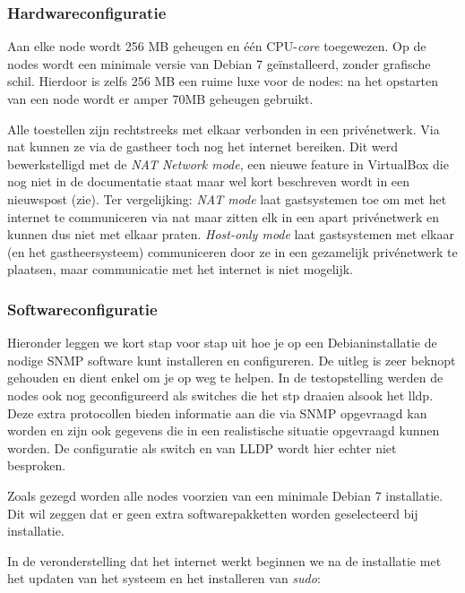 \subsubsection{Hardwareconfiguratie}

Aan elke node wordt 256 MB geheugen en één CPU-\textit{core} toegewezen.
Op de nodes wordt een minimale versie van Debian 7 geïnstalleerd, zonder grafische schil.
Hierdoor is zelfs 256 MB een ruime luxe voor de nodes: na het opstarten van een node wordt er amper 70MB geheugen gebruikt.

Alle toestellen zijn rechtstreeks met elkaar verbonden in een privénetwerk.
Via \gls{nat} kunnen ze via de gastheer toch nog het internet bereiken.
Dit werd bewerkstelligd met de \textit{NAT Network mode},
een nieuwe feature in VirtualBox die nog niet in de documentatie staat maar wel kort beschreven wordt in een nieuwspost (zie\cite{vbox-nat-network-mode}).
Ter vergelijking:
\textit{NAT mode} laat gastsystemen toe om met het internet te communiceren via \gls{nat} maar zitten elk in een apart privénetwerk en kunnen dus niet met elkaar praten.
\textit{Host-only mode} laat gastsystemen met elkaar (en het gastheersysteem) communiceren door ze in een gezamelijk privénetwerk te plaatsen, 
maar communicatie met het internet is niet mogelijk.

\subsubsection{Softwareconfiguratie}

Hieronder leggen we kort stap voor stap uit hoe je op een Debianinstallatie de nodige SNMP software kunt installeren en configureren.
De uitleg is zeer beknopt gehouden en dient enkel om je op weg te helpen.
In de testopstelling werden de nodes ook nog geconfigureerd als switches die het \gls{stp} draaien alsook het \gls{lldp}.
Deze extra protocollen bieden informatie aan die via SNMP opgevraagd kan worden en zijn ook gegevens die in een realistische situatie opgevraagd kunnen worden.
De configuratie als switch en van LLDP wordt hier echter niet besproken. 

Zoals gezegd worden alle nodes voorzien van een minimale Debian 7 installatie.
Dit wil zeggen dat er geen extra softwarepakketten worden geselecteerd bij installatie.

In de veronderstelling dat het internet werkt beginnen we na de installatie met het updaten van het systeem en het installeren van \textit{sudo}:

